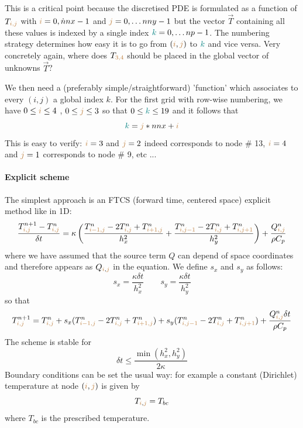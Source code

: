 This is a critical point because the discretised PDE is formulated as a function of $T_{{\color{brown} i,j}}$ 
with ${\color{brown}i}=0,\dot nnx-1$ and ${\color{brown}j}=0,\dots nny-1$ 
but the vector $\vec{T}$ containing all these values
is indexed by a single index ${\color{teal}k}=0,\dots np-1$. The numbering strategy determines how easy
it is to go from $({\color{brown}i},{\color{brown}j})$ to ${\color{teal}k}$ and vice versa. 
Very concretely again, where does $T_{\color{brown}3,4}$ should be placed in the global 
vector of unknowns $\vec{T}$?

We then need a (preferably simple/straightforward) 'function' 
which associates to every $(i,j)$ a global index $k$. 
For the first grid with row-wise numbering, we have 
$0\leq {\color{brown}i} \leq 4$ , $0 \leq {\color{brown}j} \leq 3$ 
so that $0 \leq {\color{teal}k} \leq 19$
and it follows that 
\[
{\color{teal} k}={\color{brown}j}*nnx+{\color{brown}i}
\]
This is easy to verify: ${\color{brown}i}=3$ and ${\color{brown}j}=2$ 
indeed corresponds to node \# 13, 
${\color{brown}i}=4$ and ${\color{brown}j}=1$ corresponds to node \# 9, etc ...

\begin{minipage}[t]{\textwidth}
\begin{center}

\end{center}
\end{minipage}





\paragraph{Explicit scheme} The simplest approach is an {\color{olive} FTCS} 
(forward time, centered space) explicit method like in 1D:
\[
\frac{T_{{\color{brown}i,j}}^{n+1}-T_{{\color{brown}i,j}}^n}{\delta t}
= \kappa
\left(
\frac{ T_{{\color{brown}i-1,j}}^{n}-2T_{{\color{brown}i,j}}^{n}+T_{{\color{brown}i+1,j}}^{n}  }{h_x^2} + 
\frac{ T_{{\color{brown}i,j-1}}^{n}-2T_{{\color{brown}i,j}}^{n}+T_{{\color{brown}i,j+1}}^{n}  }{h_y^2}
\right)
+\frac{Q_{{\color{brown}i,j}}^n}{\rho C_p}
\]
where we have assumed that the source term $Q$ can depend of space coordinates and therefore 
appears as $Q_{{\color{brown}i},{\color{brown}j}}$ in the equation.
We define $s_x$ and $s_y$ as follows:
\[
s_x = \frac{\kappa \delta t}{h_x^2}
\quad\quad
s_y = \frac{\kappa \delta t}{h_y^2}
\]
so that
\[
T_{{\color{brown}i,j}}^{n+1} = T_{{\color{brown}i,j}}^n 
+ s_x ( T_{{\color{brown}i-1,j}}^{n}
-2T_{{\color{brown}i,j}}^{n}
+T_{{\color{brown}i+1,j}}^{n} ) 
+s_y ( T_{{\color{brown}i,j-1}}^{n}
-2T_{{\color{brown}i,j}}^{n}
+T_{{\color{brown}i,j+1}}^{n} ) + 
\frac{Q_{{\color{brown}i,j}}^n \delta t}{\rho C_p}
\]
The scheme is stable for  
\[
\delta t \leq \frac{\min(h_x^2,h_y^2)}{2 \kappa}
\]
Boundary conditions can be set the usual way: for example a constant (Dirichlet) temperature 
at node $({\color{brown}i},{\color{brown}j})$ is given by
\[
T_{{\color{brown}i},{\color{brown}j}}=T_{bc} 
\]
where $T_{bc}$ is the prescribed temperature. 


